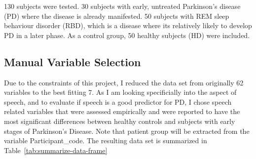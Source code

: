 \documentclass[
  english,
  doc,floatsintext]{apa6}
\begin{document}
130 subjects were tested. 30 subjects with early, untreated Parkinson's disease (PD) where the disease
is already manifested. 50 subjects with REM sleep behaviour disorder (RBD), which is a disease where
its relatively likely to develop PD in a later phase. As a control group, 50 healthy subjects (HD) were included.

\hypertarget{manual-variable-selection}{%
\subsection{Manual Variable Selection}\label{manual-variable-selection}}

Due to the constraints of this project, I reduced the data set from originally 62 variables to the best fitting 7.
As I am looking specificially into the aspect of speech, and to evaluate if speech is a good predictor for PD,
I chose speech related variables that were assessed empirically and were reported to have the most significant differences
between healthy controls and subjects with early stages of Parkinson's Disease.
Note that patient group will be extracted from the variable Participant\_code.
The resulting data set is summarized in Table~\ref{tab:summarize-data-frame}
\end{document}
